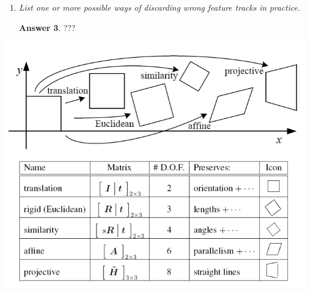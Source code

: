 \documentclass[a4paper,12 pt]{article}
\theoremstyle{definition}
\theoremstyle{remark}
\theoremstyle{definition}
\theoremstyle{definition}
\theoremstyle{definition}
\theoremstyle{definition}
\theoremstyle{remark}
\theoremstyle{remark}
\theoremstyle{definition}
\theoremstyle{definition}
\newtheorem*{answer}{Answer}
\begin{document}
\begin{enumerate}
\begin{enumerate}
\begin{answer}
\begin{figure}[h!]
\begin{center}
\caption{Pyramidal implementation. \label{fig:pyramid}}
\end{center}
\end{figure}
\end{answer}
\item \textit{llustrate alternative tracking using point features.}
\begin{answer}
\
\begin{enumerate}
\item Keypoint detection and matching. Invariant to scale, rotation or perspective.
\item Geometric verification (RANSAC)
\end{enumerate}
Issues here are:
\begin{itemize}
\item How to segment the object to track from background?
\item How to initialize the warping?
\item How to handle occlusions?
\item How to handle illumination changes andn on modeled effects?
\end{itemize}
\end{answer}
\end{enumerate}
\item \textit{List one or more possible ways of discarding wrong feature tracks in practice.}
\begin{answer}
???
\end{answer}

\end{enumerate}


\begin{center}
\includegraphics[scale=0.4]{pics/2Dtransfo}
\end{center}
\end{document}
